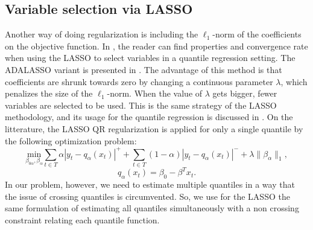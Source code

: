 \subsection{Variable selection via LASSO}
\label{sec:best-subset-ell1}

Another way of doing regularization is including the $\ell_1$-norm of the coefficients on the objective function. In \cite{belloni_l1-penalized_2009}, the reader can find properties and convergence rate when using the LASSO to select variables in a quantile regression setting. The ADALASSO variant is presented in \cite{ciuperca_adaptive_2016}. 
The advantage of this method is that coefficients are shrunk towards zero by changing a continuous parameter $\lambda$, which penalizes the size of the $\ell_1$-norm.  
When the value of $\lambda$ gets bigger, fewer variables are selected to be used. 
This is the same strategy of the LASSO methodology, and its usage for the quantile regression is discussed in \cite{li2012l1}.
On the litterature, the LASSO QR regularization is applied for only a single quantile by the following optimization problem:
\begin{equation}
\underset{\beta_{0\alpha},\beta_\alpha}{\text{min}} \sum_{t \in T}\alpha|y_{t}-q_\alpha(x_t)|^{+}+ \sum_{t \in T}(1-\alpha)|y_{t}-q_\alpha(x_t)|^{-}+\lambda\|\beta_\alpha\|_{1},
\label{eq:l1-qar-optim}
\end{equation}
\[
q_\alpha(x_t)=\beta_{0}-\beta^T x_{t}.
\]
In our problem, however, we need to estimate multiple quantiles in a way that the issue of crossing quantiles is circumvented. So, we use for the LASSO the same formulation of estimating all quantiles simultaneously with a non crossing constraint relating each quantile function.



